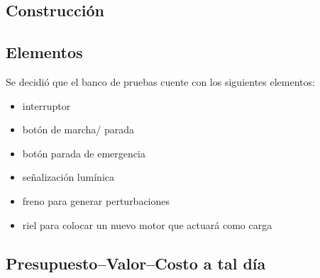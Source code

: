 \subsection{Construcción}
\subsection{Elementos}
Se decidió que el banco de pruebas cuente con los siguientes elementos:
\begin{itemize}
	\item interruptor
	\item botón de marcha/ parada
	\item botón parada de emergencia
	\item señalización lumínica
	\item freno para generar perturbaciones 
	\item riel para colocar un nuevo motor que actuará como carga
\end{itemize}
\subsection{Presupuesto--Valor--Costo a tal día}
\newpage